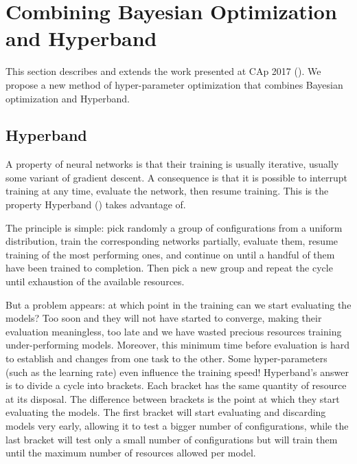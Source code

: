 \section{Combining Bayesian Optimization and Hyperband}
\label{sec:cap}

This section describes and extends the work presented at CAp 2017 (\textcite{bertrand2017CAp}). We propose a new method of hyper-parameter optimization that combines Bayesian optimization and Hyperband.

\subsection{Hyperband}
\label{ssec:hyperband}

A property of neural networks is that their training is usually iterative, usually some variant of gradient descent. A consequence is that it is possible to interrupt training at any time, evaluate the network, then resume training. This is the property Hyperband (\textcite{li2017ICLR}) takes advantage of.

The principle is simple: pick randomly a group of configurations from a uniform distribution, train the corresponding networks partially, evaluate them, resume training of the most performing ones, and continue on until a handful of them have been trained to completion. Then pick a new group and repeat the cycle until exhaustion of the available resources.

But a problem appears: at which point in the training can we start evaluating the models? Too soon and they will not have started to converge, making their evaluation meaningless, too late and we have wasted precious resources training under-performing models. Moreover, this minimum time before evaluation is hard to establish and changes from one task to the other. Some hyper-parameters (such as the learning rate) even influence the training speed! Hyperband's answer is to divide a cycle into brackets. Each bracket has the same quantity of resource at its disposal. The difference between brackets is the point at which they start evaluating the models. The first bracket will start evaluating and discarding models very early, allowing it to test a bigger number of configurations, while the last bracket will test only a small number of configurations but will train them until the maximum number of resources allowed per model.

